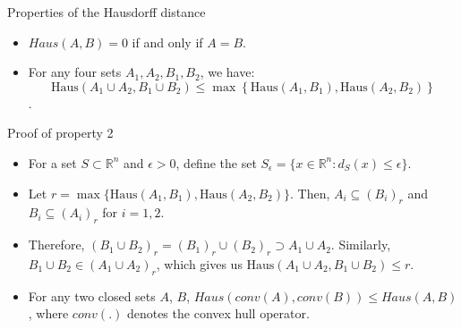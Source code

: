 \documentclass[8pt,aspectratio=169]{beamer}
\begin{document}
\begin{frame}[fragile]{Properties of the Hausdorff distance}
    \begin{itemize}
        \item $Haus(A, B) = 0$ if and only if $A = B$.
        \item For any four sets $A_1, A_2, B_1, B_2$, we have: $$\text{Haus}(A_1 \cup A_2, B_1 \cup B_2) \leq \max \left \{\text{Haus}(A_1, B_1), \text{Haus}(A_2, B_2) \right \}$$.
    \end{itemize}
    \begin{block}{Proof of property 2}
        \begin{itemize}
            \item For a set $S\subset \mathbb{R}^n$ and $\epsilon > 0$, define the set $S_{\epsilon} = \{x\in \mathbb{R}^n : d_S(x) \leq \epsilon \}$.
            \item Let $r = \max \{\text{Haus}(A_1, B_1), \text{Haus}(A_2, B_2)\}$. Then, $A_i \subseteq (B_i)_r$ and $B_i \subseteq (A_i)_r$ for $i = 1, 2$.
            \item Therefore, $(B_1\cup B_2)_r = (B_1)_r \cup (B_2)_r \supset A_1 \cup A_2$. Similarly, $B_1\cup B_2 \in (A_1\cup A_2)_r$, which gives us $\text{Haus}(A_1\cup A_2, B_1\cup B_2)\leq r$.  
        \end{itemize}      
    \end{block}
    \begin{itemize}
        \item For any two closed sets $A$, $B$, $Haus(conv(A), conv(B)) \leq Haus(A, B)$, where $conv(.)$ denotes the convex hull operator.
    \end{itemize}
\end{frame}
\end{document}
